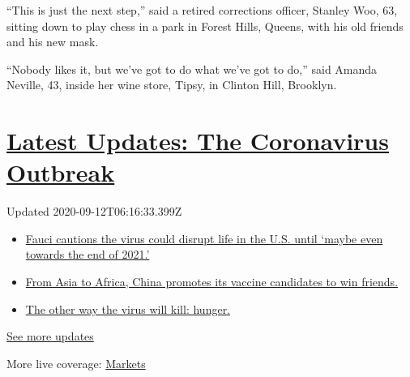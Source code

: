 ``This is just the next step,'' said a retired corrections officer,
Stanley Woo, 63, sitting down to play chess in a park in Forest Hills,
Queens, with his old friends and his new mask.

``Nobody likes it, but we've got to do what we've got to do,'' said
Amanda Neville, 43, inside her wine store, Tipsy, in Clinton Hill,
Brooklyn.

\hypertarget{latest-updates-the-coronavirus-outbreak}{%
\section{\texorpdfstring{\href{https://www.nytimes3xbfgragh.onion/2020/09/11/world/covid-19-coronavirus.html?action=click\&pgtype=Article\&state=default\&region=MAIN_CONTENT_1\&context=storylines_live_updates}{Latest
Updates: The Coronavirus
Outbreak}}{Latest Updates: The Coronavirus Outbreak}}\label{latest-updates-the-coronavirus-outbreak}}

Updated 2020-09-12T06:16:33.399Z

\begin{itemize}
\tightlist
\item
  \href{https://www.nytimes3xbfgragh.onion/2020/09/11/world/covid-19-coronavirus.html?action=click\&pgtype=Article\&state=default\&region=MAIN_CONTENT_1\&context=storylines_live_updates\#link-dfb8a16}{Fauci
  cautions the virus could disrupt life in the U.S. until `maybe even
  towards the end of 2021.'}
\item
  \href{https://www.nytimes3xbfgragh.onion/2020/09/11/world/covid-19-coronavirus.html?action=click\&pgtype=Article\&state=default\&region=MAIN_CONTENT_1\&context=storylines_live_updates\#link-7104d154}{From
  Asia to Africa, China promotes its vaccine candidates to win friends.}
\item
  \href{https://www.nytimes3xbfgragh.onion/2020/09/11/world/covid-19-coronavirus.html?action=click\&pgtype=Article\&state=default\&region=MAIN_CONTENT_1\&context=storylines_live_updates\#link-393ad215}{The
  other way the virus will kill: hunger.}
\end{itemize}

\href{https://www.nytimes3xbfgragh.onion/2020/09/11/world/covid-19-coronavirus.html?action=click\&pgtype=Article\&state=default\&region=MAIN_CONTENT_1\&context=storylines_live_updates}{See
more updates}

More live coverage:
\href{https://www.nytimes3xbfgragh.onion/live/2020/09/11/business/stock-market-today-coronavirus?action=click\&pgtype=Article\&state=default\&region=MAIN_CONTENT_1\&context=storylines_live_updates}{Markets}

